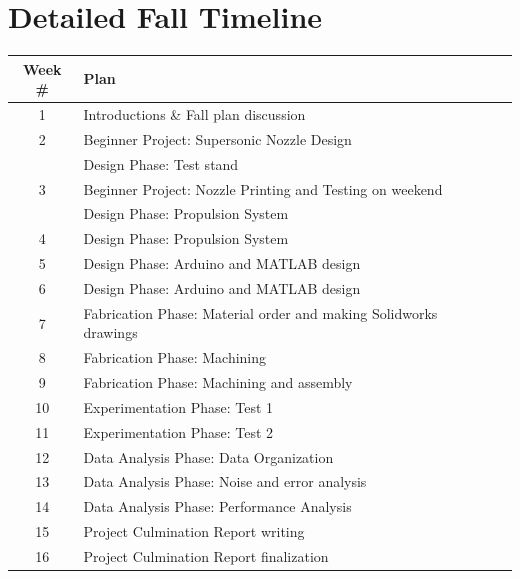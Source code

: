\documentclass[conference]{IEEEtran} %
\begin{document}
\section{\textbf{Detailed Fall Timeline}}
\begin{table}[ht]
  \centering
  \begin{tabularx}{\columnwidth}{@{}cXl@{}cXl@{}} \toprule
    Week \# & Plan \\
    \midrule
    1 & Introductions \& Fall plan discussion \\

    2 & Beginner Project: Supersonic Nozzle Design  \\
    & Design Phase: Test stand \\

    3 & Beginner Project: Nozzle Printing and Testing on weekend \\
    & Design Phase: Propulsion System \\

    4 & Design Phase: Propulsion System \\

    5 & Design Phase: Arduino and MATLAB design \\

    6 & Design Phase: Arduino and MATLAB design \\

    7 & Fabrication Phase: Material order and making Solidworks drawings\\

    8 & Fabrication Phase: Machining \\

    9 & Fabrication Phase: Machining and assembly \\

    10 & Experimentation Phase: Test 1 \\

    11 & Experimentation Phase: Test 2 \\

    12 & Data Analysis Phase: Data Organization \\

    13 & Data Analysis Phase: Noise and error analysis \\

    14 & Data Analysis Phase: Performance Analysis \\

    15 & Project Culmination Report writing \\

    16 & Project Culmination Report finalization \\
    \bottomrule
  \end{tabularx}
\label{tab:fall-plan}
\end{table}
\end{document}
